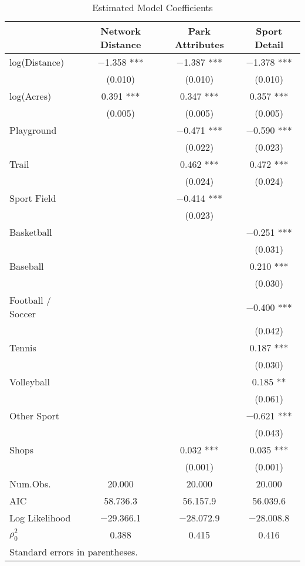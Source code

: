 \documentclass[3p, authoryear, review]{elsarticle} %
\begin{document}
\begin{table}

\caption{\label{tab:base-modelsummary}Estimated Model Coefficients}
\centering
\begin{tabular}[t]{lccc}
\toprule
  & Network Distance & Park Attributes & Sport Detail\\
\midrule
log(Distance) & \num{-1.358} *** & \num{-1.387} *** & \num{-1.378} ***\\
 & (\num{0.010}) & (\num{0.010}) & (\num{0.010})\\
log(Acres) & \num{0.391} *** & \num{0.347} *** & \num{0.357} ***\\
 & (\num{0.005}) & (\num{0.005}) & (\num{0.005})\\
Playground &  & \num{-0.471} *** & \num{-0.590} ***\\
 &  & (\num{0.022}) & (\num{0.023})\\
Trail &  & \num{0.462} *** & \num{0.472} ***\\
 &  & (\num{0.024}) & (\num{0.024})\\
Sport Field &  & \num{-0.414} *** & \\
 &  & (\num{0.023}) & \\
Basketball &  &  & \num{-0.251} ***\\
 &  &  & (\num{0.031})\\
Baseball &  &  & \num{0.210} ***\\
 &  &  & \vphantom{1} (\num{0.030})\\
Football / Soccer &  &  & \num{-0.400} ***\\
 &  &  & (\num{0.042})\\
Tennis &  &  & \num{0.187} ***\\
 &  &  & (\num{0.030})\\
Volleyball &  &  & \num{0.185} **\\
 &  &  & (\num{0.061})\\
Other Sport &  &  & \num{-0.621} ***\\
 &  &  & (\num{0.043})\\
Shops &  & \num{0.032} *** & \num{0.035} ***\\
 &  & (\num{0.001}) & (\num{0.001})\\
\midrule
Num.Obs. & \num{20,000} & \num{20,000} & \num{20,000}\\
AIC & \num{58,736.3} & \num{56,157.9} & \num{56,039.6}\\
Log Likelihood & \num{-29,366.1} & \num{-28,072.9} & \num{-28,008.8}\\
$\rho^2_0$ & \num{0.388} & \num{0.415} & \num{0.416}\\
\bottomrule
\multicolumn{4}{l}{\rule{0pt}{1em}Standard errors in parentheses.}\\
\end{tabular}
\end{table}
\end{document}
